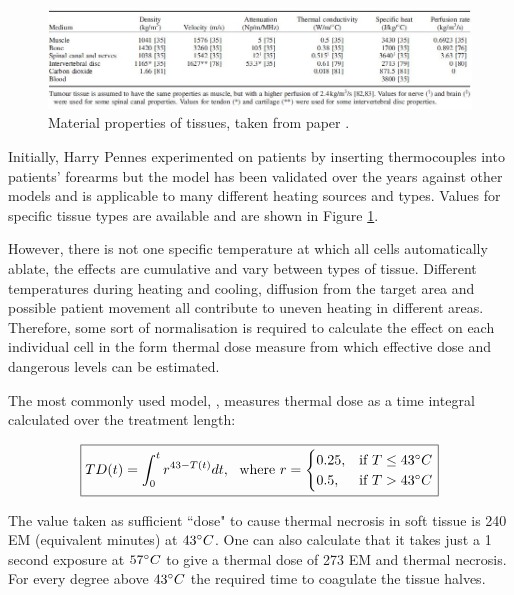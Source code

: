 \documentclass[11pt]{article} %
\begin{document}
	
	
	\begin{figure}
		\centering
		\includegraphics[width=1\linewidth]{Report_images/tissueproperties}
		\caption{Material properties of tissues, taken from paper \cite{Scott2014}.}
		\label{fig:tissueproperties}
	\end{figure}
	
	Initially, Harry Pennes experimented on patients by inserting thermocouples into patients' forearms but the model has been validated over the years against other models and is applicable to many different heating sources and types. Values for specific tissue types are available and are shown in Figure \ref{fig:tissueproperties}. 
	
	However, there is not one specific temperature at which all cells automatically ablate, the effects are cumulative and vary between types of tissue. Different temperatures during heating and cooling, diffusion from the target area and possible patient movement all contribute to uneven heating in different areas. Therefore, some sort of normalisation is required to calculate the effect on each individual cell in the form thermal dose measure  from which effective dose and dangerous levels can be estimated. 
	
	
	
	The most commonly used model, \cite{Sapareto1984a},  measures thermal dose as a time integral calculated over the treatment length:
	
\begin{equation}
\boxed{TD(t)=\int_{0}^{t}r^{43-T(t)}dt,\ \ \text{where  } r=
\begin{cases}
0.25, & \text{if}\ T\leq 43 \degree C \\
0.5, & \text{if}\ T>43 \degree C 
\end{cases}}
\label{Sapereto}
\end{equation}
	
	The value taken as sufficient ``dose" to cause thermal necrosis in soft tissue is 240 EM (equivalent minutes) at $43 \degree C $. One can also calculate that it takes just a 1 second exposure at $57 \degree C $ to give a thermal dose of 273 EM and thermal necrosis. For every degree above  $43 \degree C $ the required time to coagulate the tissue halves. 
	
\end{document}
